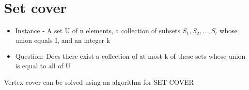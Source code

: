 \documentclass{article}[18pt]
\begin{document}
\section{Set cover}
\begin{itemize}
	\item Instance - A set U of n elements, a collection of subsets $S_1,S_2,...,S_t$ whose union equals I, and an integer k
	\item Question: Does there exist a collection of at most k of these sets whose union is equal to all of U
\end{itemize}
Vertex cover can be solved using an algorithm for SET COVER
\end{document}
